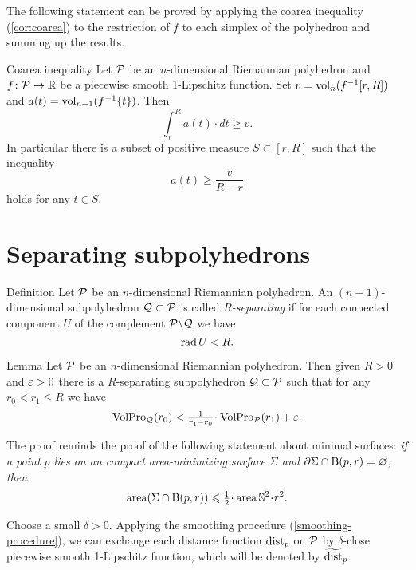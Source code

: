 The following statement can be proved by applying the coarea inequality (\ref{cor:coarea}) to the restriction of $f$ to each simplex of the polyhedron and summing up the results.

\begin{thm}{Coarea inequality}\label{poly-coarea}
Let $\mathcal{P}$ be an $n$-dimensional Riemannian polyhedron and $f\colon\mathcal{P}\to \mathbb{R}$ be a piecewise smooth 1-Lipschitz function.
Set $v\z=\vol_n (f^{-1}[r,R])$ and $a(t)=\operatorname{\rm vol}\nolimits_{n-1}(f^{-1}\{t\})$.
Then 
\[\int_r^Ra(t)\cdot dt\ge v .\]
In particular there is a subset of positive measure $S\subset [r,R]$ such that the inequality 
\[a(t)\ge \frac v{R-r}\]
holds for any $t\in S$.
\end{thm}

\section*{Separating subpolyhedrons}

\begin{thm}{Definition}
Let $\mathcal{P}$ be an $n$-dimensional Riemannian polyhedron.
An $(n-1)$-dimensional subpolyhedron $\mathcal{Q}\subset\mathcal{P}$ is called \emph{$R$-separating} if for each connected component $U$ of the complement $\mathcal{P}\backslash \mathcal{Q}$ we have 
\[\mathop{\rm rad}\nolimits U<R.\]

\end{thm}



\begin{thm}{Lemma}\label{lem:separating}
Let $\mathcal{P}$ be an $n$-dimensional Riemannian polyhedron.
Then given $R>0$ and $\varepsilon>0$ there is a $R$-separating subpolyhedron $\mathcal{Q}\subset\mathcal{P}$ such that for any $r_0<r_1\le R$ we have
\[\VolPro_{\spc{Q}}(r_0)< \tfrac1{r_1-r_0}\cdot \VolPro_{\spc{P}}(r_1)+\eps.\]

\end{thm}

The proof reminds the proof of the following statement about minimal surfaces: 
\emph{if a point $p$ lies on an compact area-minimizing surface $\Sigma$ and $\partial\Sigma \cap \mathrm{B}{}(p,r)=\varnothing$, then
\[\area(\Sigma\cap \oBall(p,r))\le \tfrac12\cdot \area\mathbb{S}^2\cdot r^2.\]
}


Choose a small $\delta>0$.
Applying the smoothing procedure (\ref{smoothing-procedure}), we can exchange each distance function $\mathrm{dist}_p$ on $\mathcal{P}$ by $\delta$-close piecewise smooth 1-Lipschitz function, which will be denoted by $\widetilde {\mathrm{dist}}_p$.

